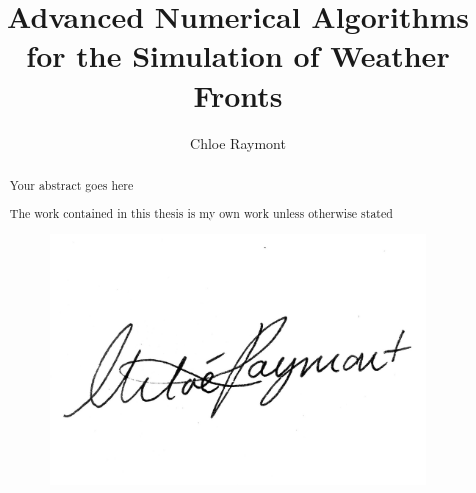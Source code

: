 \documentclass[a4paper, 12pt, twoside]{report}
\title{Advanced Numerical Algorithms for the Simulation of Weather Fronts}
\author{Chloe Raymont}
\theoremstyle{definition}
\begin{document}


\begin{abstract}
Your abstract goes here
\end{abstract}

\renewcommand{\abstractname}{Acknowledgements}
\begin{abstract}

\end{abstract}
\renewcommand{\abstractname}{Declaration}
\begin{abstract}
	The work contained in this thesis is my own work unless otherwise stated
	\begin{figure}[h]
		\centering
		\includegraphics[width=0.7\linewidth]{ChloeRaymont_esignature}
	\end{figure}
	
\end{abstract}

\tableofcontents
\listoffigures










\end{document}
